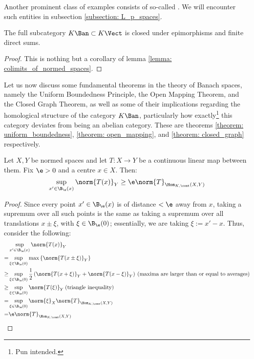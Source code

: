         Another prominent class of examples consists of so-called . We will encounter such entities in subsection \ref{subsection: L_p_spaces}.

        \begin{lemma} \label{lemma: colimits_of_banach_spaces}
            The full subcategory $K\-\Ban \subset K\-\Vect$ is closed under epimorphisms and finite direct sums. 
        \end{lemma}
            \begin{proof}
                This is nothing but a corollary of lemma \ref{lemma: colimits_of_normed_spaces}.
            \end{proof}
    
        Let us now discuss some fundamental theorems in the theory of Banach spaces, namely the Uniform Boundedness Principle, the Open Mapping Theorem, and the Closed Graph Theorem, as well as some of their implications regarding the homological structure of the category $K\-\Ban$, particularly how exactly\footnote{Pun intended.} this category deviates from being an abelian category. These are theorems \ref{theorem: uniform_boundedness}, \ref{theorem: open_mapping}, and \ref{theorem: closed_graph} respectively.
        \begin{lemma} \label{lemma: suprema_of_averages}
            Let $X, Y$ be normed spaces and let $T: X \to Y$ be a continuous linear map between them. Fix $\e > 0$ and a centre $x \in X$. Then:
                $$\sup_{x' \in \B_{\e}(x)} \norm{T(x)}_Y \geq \e \norm{T}_{\Hom_{K, \cont}(X, Y)}$$
        \end{lemma}
            \begin{proof}
                Since every point $x' \in \B_{\e}(x)$ is of distance $< \e$ away from $x$, taking a supremum over all such points is the same as taking a supremum over all translations $x \pm \xi$, with $\xi \in \B_{\e}(0)$; essentially, we are taking $\xi := x' - x$. Thus, consider the following:
                    $$
                        \begin{aligned}
                            & \sup_{x' \in \B_{\e}(x)} \norm{T(x)}_Y
                            \\
                            = & \sup_{\xi \in \B_{\e}(0)} \max\left\{ \norm{T(x \pm \xi)}_Y \right\}
                            \\
                            \geq & \sup_{\xi \in \B_{\e}(0)} \frac12\left( \norm{T(x + \xi)}_Y + \norm{T(x - \xi)}_Y \right) \: \text{(maxima are larger than or equal to averages)}
                            \\
                            \geq & \sup_{\xi \in \B_{\e}(0)} \norm{T(\xi)}_Y \: \text{(triangle inequality)}
                            \\
                            = & \sup_{\xi \in \B_{\e}(0)} \norm{\xi}_X \norm{T}_{\Hom_{K, \cont}(X, Y)}
                            \\
                            = & \e \norm{T}_{\Hom_{K, \cont}(X, Y)}
                        \end{aligned}
                    $$
            \end{proof}
